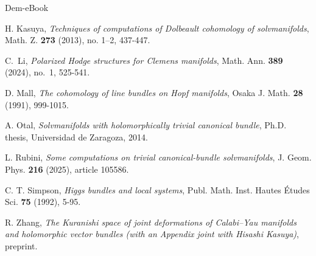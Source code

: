 \documentclass[11pt]{amsart}
\numberwithin{equation}{section}
\theoremstyle{definition}
\theoremstyle{plain}
\theoremstyle{plain}
\theoremstyle{definition}
\theoremstyle{stepstyle}
\begin{document}
\begin{thebibliography}{Dem-eBook}
		
		
		
		H. Kasuya,
		\newblock \textit{Techniques of computations of Dolbeault cohomology of solvmanifolds},
		\newblock Math. Z. \textbf{273} (2013), no. 1--2, 437-447.
		
		
		
		
		C.~Li,
		\textit{Polarized Hodge structures for Clemens manifolds},
		Math. Ann. \textbf{389} (2024), no.~1, 525-541.
		
		
		 D. Mall, \textit{The cohomology of line bundles on Hopf manifolds}, Osaka J. Math. \textbf{28} (1991), 999-1015.
		
		
		A. Otal,
		\newblock \textit{Solvmanifolds with holomorphically trivial canonical bundle},
		\newblock Ph.D. thesis, Universidad de Zaragoza, 2014.
		
		L. Rubini,
		\newblock \textit{Some computations on trivial canonical-bundle solvmanifolds},
		\newblock J. Geom. Phys. \textbf{216} (2025), article 105586.
		
		C. T. Simpson,
		\newblock \textit{Higgs bundles and local systems},
		\newblock Publ. Math. Inst. Hautes \'Etudes Sci. \textbf{75} (1992), 5-95.
		
		
		R. Zhang, \textit{The Kuranishi space of joint deformations of Calabi--Yau
			manifolds and holomorphic vector bundles (with an Appendix joint with Hisashi Kasuya)}, preprint.
	\end{thebibliography}
\end{document}

